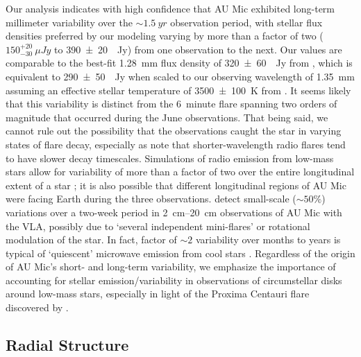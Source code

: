 \documentclass[modern]{aastex62}
\begin{document}
Our analysis indicates with high confidence that AU Mic exhibited long-term millimeter variability over the $\sim \SI{1.5}{yr}$ observation period, with stellar
flux densities preferred by our modeling varying by more than a factor of two ($150^{+20}_{-30}~\si{\mu Jy}$ to \SI{390 \pm 20}{\mu Jy}) from one observation to the next.
Our values are comparable to the best-fit \SI{1.28}{mm} flux density of \SI{320 \pm 60}{\mu Jy} from \citet{macgregor13}, which is equivalent to \SI{290 \pm 50}{\mu Jy} when scaled to our observing wavelength of \SI{1.35}{mm} assuming an effective stellar temperature of \SI{3500 \pm 100}{K} from \citet{plavchan09}.
It seems likely that this variability is distinct from the \SI{6}{minute} flare spanning two orders of magnitude that occurred during the June observations. 
That being said, we cannot rule out the possibility that the observations caught the star in varying states of flare decay, especially as \citet{white96} note that shorter-wavelength radio flares tend to have slower decay timescales.
Simulations of radio emission from low-mass stars allow for variability of more than a factor of two over the entire longitudinal extent of a star \citep{llama18}; it is also possible that different longitudinal regions of AU Mic were facing Earth during the three observations.
\citet{cox85} detect small-scale ($\sim 50\%$) variations over  a two-week period in \SIrange{2}{20}{cm} observations of AU Mic with the VLA, possibly due to `several independent mini-flares' or rotational modulation of the star.
In fact, factor of $\sim 2$ variability over months to years is typical of `quiescent' microwave emission from cool stars \citep{guedel94}.
Regardless of the origin of AU Mic's short- and long-term variability, we emphasize the importance of accounting for stellar emission/variability in observations of circumstellar disks around low-mass stars, especially in light of the Proxima Centauri flare discovered by \citet{macgregor18}.


\subsection{Radial Structure}
\label{subsection: radial discussion}
\end{document}
